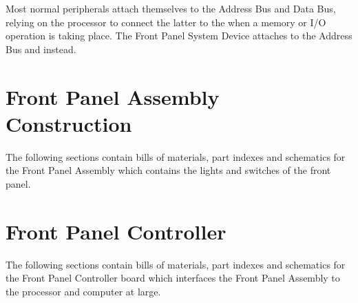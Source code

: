 Most normal peripherals attach themselves to the Address Bus and Data Bus,
relying on the processor to connect the latter to the \IBUS{} when a memory or
I/O operation is taking place. The Front Panel System Device attaches to the
Address Bus and {\em \IBUS{}\/} instead. 

\section{Front Panel Assembly Construction}

The following sections contain bills of materials, part indexes and schematics
for the Front Panel Assembly which contains the lights and switches of the
front panel.












%
%

\section{Front Panel Controller}

The following sections contain bills of materials, part indexes and schematics
for the Front Panel Controller board which interfaces the Front Panel Assembly
to the processor and computer at large.

